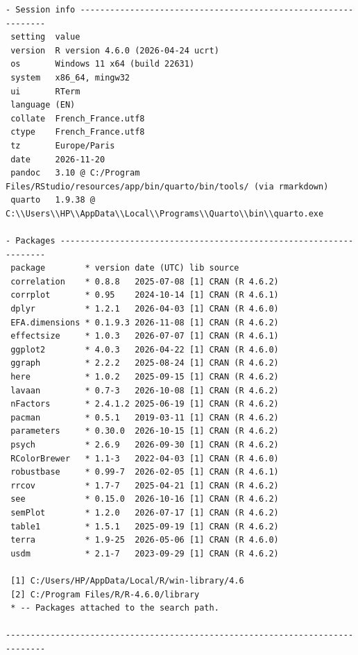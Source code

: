 \documentclass[
  french,
  11pt,
  a4paper,
]{article}
\begin{document}
\begin{verbatim}
- Session info ---------------------------------------------------------------
 setting  value
 version  R version 4.6.0 (2026-04-24 ucrt)
 os       Windows 11 x64 (build 22631)
 system   x86_64, mingw32
 ui       RTerm
 language (EN)
 collate  French_France.utf8
 ctype    French_France.utf8
 tz       Europe/Paris
 date     2026-11-20
 pandoc   3.10 @ C:/Program Files/RStudio/resources/app/bin/quarto/bin/tools/ (via rmarkdown)
 quarto   1.9.38 @ C:\\Users\\HP\\AppData\\Local\\Programs\\Quarto\\bin\\quarto.exe

- Packages -------------------------------------------------------------------
 package        * version date (UTC) lib source
 correlation    * 0.8.8   2025-07-08 [1] CRAN (R 4.6.2)
 corrplot       * 0.95    2024-10-14 [1] CRAN (R 4.6.1)
 dplyr          * 1.2.1   2026-04-03 [1] CRAN (R 4.6.0)
 EFA.dimensions * 0.1.9.3 2026-11-08 [1] CRAN (R 4.6.2)
 effectsize     * 1.0.3   2026-07-07 [1] CRAN (R 4.6.1)
 ggplot2        * 4.0.3   2026-04-22 [1] CRAN (R 4.6.0)
 ggraph         * 2.2.2   2025-08-24 [1] CRAN (R 4.6.2)
 here           * 1.0.2   2025-09-15 [1] CRAN (R 4.6.2)
 lavaan         * 0.7-3   2026-10-08 [1] CRAN (R 4.6.2)
 nFactors       * 2.4.1.2 2025-06-19 [1] CRAN (R 4.6.2)
 pacman         * 0.5.1   2019-03-11 [1] CRAN (R 4.6.2)
 parameters     * 0.30.0  2026-10-15 [1] CRAN (R 4.6.2)
 psych          * 2.6.9   2026-09-30 [1] CRAN (R 4.6.2)
 RColorBrewer   * 1.1-3   2022-04-03 [1] CRAN (R 4.6.0)
 robustbase     * 0.99-7  2026-02-05 [1] CRAN (R 4.6.1)
 rrcov          * 1.7-7   2025-04-21 [1] CRAN (R 4.6.2)
 see            * 0.15.0  2026-10-16 [1] CRAN (R 4.6.2)
 semPlot        * 1.2.0   2026-07-17 [1] CRAN (R 4.6.2)
 table1         * 1.5.1   2025-09-19 [1] CRAN (R 4.6.2)
 terra          * 1.9-25  2026-05-06 [1] CRAN (R 4.6.0)
 usdm           * 2.1-7   2023-09-29 [1] CRAN (R 4.6.2)

 [1] C:/Users/HP/AppData/Local/R/win-library/4.6
 [2] C:/Program Files/R/R-4.6.0/library
 * -- Packages attached to the search path.

------------------------------------------------------------------------------
\end{verbatim}
\end{document}
